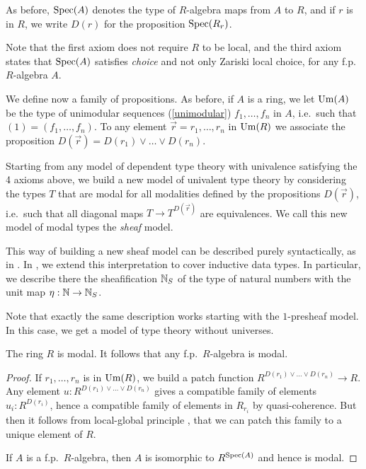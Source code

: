 As before, $\operatorname{Spec}(A)$ denotes the type of $R$-algebra maps from $A$ to $R$, and
if $r$ is in $R$, we write $D(r)$ for the proposition $\operatorname{Spec}(R_r)$.

Note that the first axiom does not require
$R$ to be local, and the third axiom states that $\operatorname{Spec}(A)$ satisfies \emph{choice} and not only Zariski local choice,
for any f.p. $R$-algebra $A$.

We define now a family of propositions. As before, if $A$ is a ring, we let $\mathrm{Um}(A)$ be the type of unimodular sequences
(\cref{unimodular})
$f_1,\dots,f_n$ in $A$, i.e.\ such that $(1) = (f_1,\dots,f_n)$. To any element $\vec{r} = r_1,\dots,r_n$
in $\mathrm{Um}(R)$ we associate
the proposition $D(\vec{r}) = D(r_1)\vee\dots\vee D(r_n)$.%

  Starting from any model of dependent type theory with univalence satisfying the 4 axioms above, we build a new
  model of univalent type theory by considering the types $T$ that are modal for all modalities defined by the propositions
  $D(\vec{r})$, i.e.\ such that all diagonal maps $T\rightarrow T^{D(\vec{r})}$ are equivalences.
    We call this new model of modal types the \emph{sheaf} model.

    This way of building a new sheaf model can be described purely syntactically, as in \cite{Quirin16}. In \cite{CRS21}, we extend
    this interpretation to cover inductive data types. In particular, we describe there the sheafification $\mathbb{N}_S$ of the type
    of natural numbers with the unit map $\eta:\mathbb{N}\rightarrow\mathbb{N}_S$. 

    Note that exactly the same description works starting with the $1$-presheaf model. In this case, we get a model
    of type theory without universes.

    \begin{proposition}\label{modal}
      The ring $R$ is modal. It follows that any f.p.\ $R$-algebra is modal.
    \end{proposition}

    \begin{proof}
      If $r_1,\dots,r_n$ is in $\mathrm{Um}(R)$, we build a patch function $R^{D(r_1)\vee\dots\vee D(r_n)}\rightarrow R$.
      Any element $u:R^{D(r_1)\vee\dots\vee D(r_n)}$ gives a compatible family of elements $u_i:R^{D(r_i)}$, hence
      a compatible family of elements in $R_{r_i}$ by quasi-coherence. But then it follows from local-global
      principle \cite{lombardi-quitte}, that we can patch this family to a unique element of $R$.
      
      If $A$ is a f.p.\ $R$-algebra, then $A$ is isomorphic to $R^{\operatorname{Spec}(A)}$ and hence is modal.
    \end{proof}

